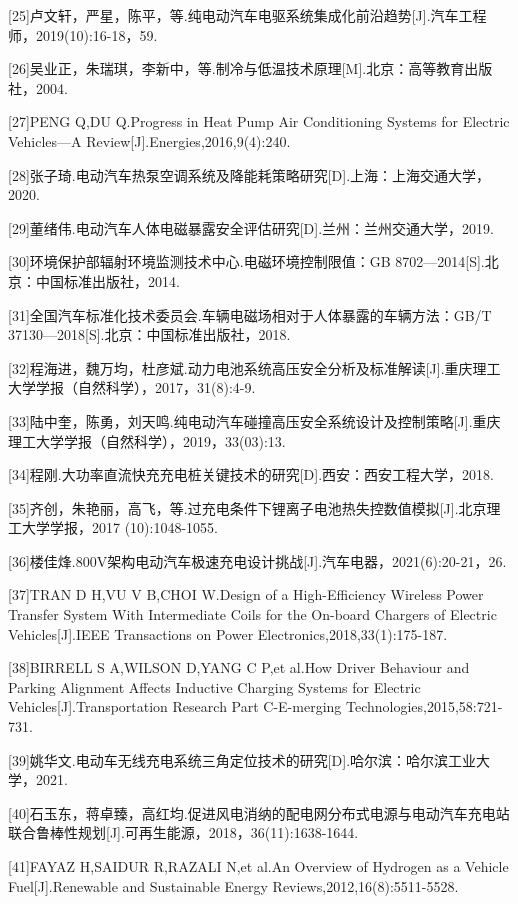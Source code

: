 \documentclass[12pt,UTF8]{ctexbook}
\begin{document}
[25]卢文轩，严星，陈平，等.纯电动汽车电驱系统集成化前沿趋势[J].汽车工程师，2019(10):16-18，59.

[26]吴业正，朱瑞琪，李新中，等.制冷与低温技术原理[M].北京：高等教育出版社，2004.

[27]PENG Q,DU Q.Progress in Heat Pump Air Conditioning Systems for Electric Vehicles—A Review[J].Energies,2016,9(4):240.

[28]张子琦.电动汽车热泵空调系统及降能耗策略研究[D].上海：上海交通大学，2020.

[29]董绪伟.电动汽车人体电磁暴露安全评估研究[D].兰州：兰州交通大学，2019.

[30]环境保护部辐射环境监测技术中心.电磁环境控制限值：GB 8702—2014[S].北京：中国标准出版社，2014.

[31]全国汽车标准化技术委员会.车辆电磁场相对于人体暴露的车辆方法：GB/T 37130—2018[S].北京：中国标准出版社，2018.

[32]程海进，魏万均，杜彦斌.动力电池系统高压安全分析及标准解读[J].重庆理工大学学报（自然科学），2017，31(8):4-9.

[33]陆中奎，陈勇，刘天鸣.纯电动汽车碰撞高压安全系统设计及控制策略[J].重庆理工大学学报（自然科学），2019，33(03):13.

[34]程刚.大功率直流快充充电桩关键技术的研究[D].西安：西安工程大学，2018.

[35]齐创，朱艳丽，高飞，等.过充电条件下锂离子电池热失控数值模拟[J].北京理工大学学报，2017 (10):1048-1055.

[36]楼佳烽.800V架构电动汽车极速充电设计挑战[J].汽车电器，2021(6):20-21，26.

[37]TRAN D H,VU V B,CHOI W.Design of a High-Efficiency Wireless Power Transfer System With Intermediate Coils for the On-board Chargers of Electric Vehicles[J].IEEE Transactions on Power Electronics,2018,33(1):175-187.

[38]BIRRELL S A,WILSON D,YANG C P,et al.How Driver Behaviour and Parking Alignment Affects Inductive Charging Systems for Electric Vehicles[J].Transportation Research Part C-E-merging Technologies,2015,58:721-731.

[39]姚华文.电动车无线充电系统三角定位技术的研究[D].哈尔滨：哈尔滨工业大学，2021.

[40]石玉东，蒋卓臻，高红均.促进风电消纳的配电网分布式电源与电动汽车充电站联合鲁棒性规划[J].可再生能源，2018，36(11):1638-1644.

[41]FAYAZ H,SAIDUR R,RAZALI N,et al.An Overview of Hydrogen as a Vehicle Fuel[J].Renewable and Sustainable Energy Reviews,2012,16(8):5511-5528.
\end{document}
